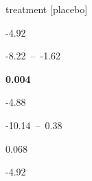 \documentclass[
  letterpaper,
  DIV=11,
  numbers=noendperiod]{scrartcl}
\begin{document}
\begin{table}
\begin{minipage}[t]{\linewidth}
{treatment {[}placebo{]}

}

\end{minipage}%
\newline
\begin{minipage}[t]{\linewidth}

{\centering 

-4.92

}

\end{minipage}%
\newline
\begin{minipage}[t]{\linewidth}

{\centering 

-8.22~--~-1.62

}

\end{minipage}%
\newline
\begin{minipage}[t]{\linewidth}

{\centering 

\textbf{0.004}

}

\end{minipage}%
\newline
\begin{minipage}[t]{\linewidth}

{\centering 

-4.88

}

\end{minipage}%
\newline
\begin{minipage}[t]{\linewidth}

{\centering 

-10.14~--~0.38

}

\end{minipage}%
\newline
\begin{minipage}[t]{\linewidth}

{\centering 

0.068

}

\end{minipage}%
\newline
\begin{minipage}[t]{\linewidth}

{\centering 

-4.92

}
\end{minipage}
\end{table}
\end{document}
